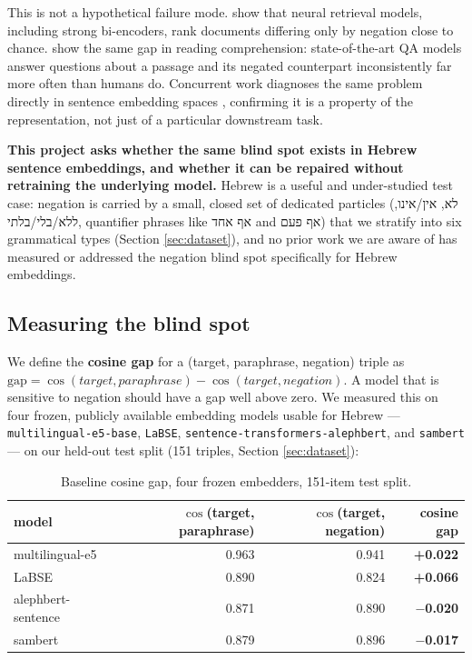 \documentclass{article}
\newcommand{\heb}[1]{{\hebrewfont #1}}
\begin{document}
This is not a hypothetical failure mode. \citet{weller2024nevir} show that
neural retrieval models, including strong bi-encoders, rank documents
differing only by negation close to chance. \citet{ravichander2022condaqa}
show the same gap in reading comprehension: state-of-the-art QA models
answer questions about a passage and its negated counterpart inconsistently
far more often than humans do. Concurrent work diagnoses the same problem
directly in sentence embedding spaces \citep{cao2025semanticadapter},
confirming it is a property of the representation, not just of a
particular downstream task.

\textbf{This project asks whether the same blind spot exists in Hebrew
sentence embeddings, and whether it can be repaired without retraining the
underlying model.} Hebrew is a useful and under-studied test case: negation
is carried by a small, closed set of dedicated particles (\heb{לא},
\heb{אין}/\heb{אינו}, \heb{ללא}/\heb{בלי}/\heb{בלתי}, quantifier phrases like
\heb{אף אחד} and \heb{אף פעם}) that we stratify into six grammatical types
(Section \ref{sec:dataset}), and no prior work we are aware of has measured
or addressed the negation blind spot specifically for Hebrew embeddings.

\subsection*{Measuring the blind spot}

We define the \textbf{cosine gap} for a (target, paraphrase, negation)
triple as $\mathrm{gap} = \cos(\mathit{target}, \mathit{paraphrase}) -
\cos(\mathit{target}, \mathit{negation})$. A model that is sensitive to
negation should have a gap well above zero. We measured this on four
frozen, publicly available embedding models usable for Hebrew ---
\texttt{multilingual-e5-base}, \texttt{LaBSE}, \texttt{sentence-transformers-alephbert},
and \texttt{sambert} --- on our held-out test split (151 triples, Section
\ref{sec:dataset}):

\begin{table}[h]
\centering
\small
\begin{tabular}{lrrr}
\toprule
model & $\cos$(target, paraphrase) & $\cos$(target, negation) & cosine gap \\
\midrule
multilingual-e5 & 0.963 & 0.941 & \textbf{+0.022} \\
LaBSE & 0.890 & 0.824 & \textbf{+0.066} \\
alephbert-sentence & 0.871 & 0.890 & \textbf{$-$0.020} \\
sambert & 0.879 & 0.896 & \textbf{$-$0.017} \\
\bottomrule
\end{tabular}
\caption{Baseline cosine gap, four frozen embedders, 151-item test split.}
\label{tab:baseline}
\end{table}
\end{document}
